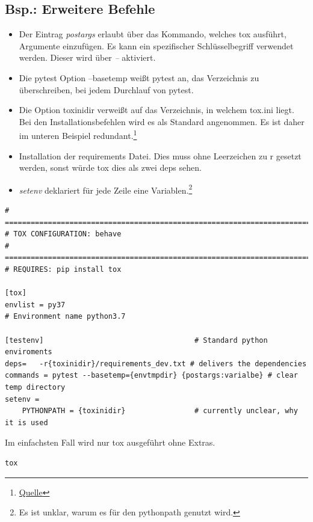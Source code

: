 \subsection{Bsp.: Erweitere Befehle}

\begin{itemize}
	\item Der Eintrag \textit{postargs} erlaubt über das Kommando, welches tox ausführt, Argumente einzufügen. Es kann ein spezifischer Schlüsselbegriff verwendet werden. Dieser wird über \textit{--} aktiviert.
	\item Die pytest Option --basetemp weißt pytest an, das Verzeichnis zu überschreiben, bei jedem Durchlauf von pytest.
	\item Die Option toxinidir verweißt auf das Verzeichnis, in welchem tox.ini liegt. Bei den Installationsbefehlen wird es als Standard angenommen. Es ist daher im unteren Beispiel redundant.\footnote{
	\href{https://tox.wiki/en/latest/example/basic.htmldepending-on-requirements-txt-or-defining-constraints}{Quelle}
}
	\item Installation der requirements Datei. Dies muss ohne Leerzeichen zu r gesetzt werden, sonst würde tox dies als zwei deps sehen.
	\item \textit{setenv} deklariert für jede Zeile eine Variablen.\footnote{
		Es ist unklar, warum es für den pythonpath genutzt wird.
	}
\end{itemize}


\begin{lstlisting}[style=Config]
# ============================================================================
# TOX CONFIGURATION: behave
# ============================================================================
# REQUIRES: pip install tox

[tox]
envlist = py37
# Environment name python3.7

[testenv] 									# Standard python enviroments
deps=	-r{toxinidir}/requirements_dev.txt # delivers the dependencies
commands = pytest --basetemp={envtmpdir} {postargs:varialbe} # clear temp directory
setenv = 
	PYTHONPATH = {toxinidir}				# currently unclear, why it is used
\end{lstlisting}

Im einfachsten Fall wird nur tox ausgeführt ohne Extras.
\begin{lstlisting}[style=CMD, caption={Bsp.: Befehl zum Ausführen von tox}, captionpos=b]
tox 
\end{lstlisting}

